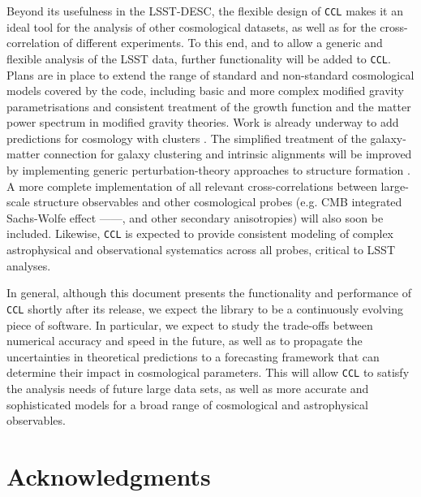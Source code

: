 \documentclass[\docopts]{\docclass}
\newcommand{\ccl}{{\tt CCL}\xspace}
\begin{document}
Beyond its usefulness in the LSST-DESC, the flexible design of \ccl makes it an ideal tool for the analysis of other cosmological datasets, as well as for the cross-correlation of different experiments. To this end, and to allow a generic and flexible analysis of the LSST data, further functionality will be added to \ccl. Plans are in place to extend the range of standard and non-standard cosmological models covered by the code, including basic and more complex modified gravity parametrisations \citep{Silvestri2013, Bellini2014} and consistent treatment of the growth function and the matter power spectrum in modified gravity theories. Work is already underway to add predictions for cosmology with clusters \citep{McClintock18}. The simplified treatment of the galaxy-matter connection for galaxy clustering and intrinsic alignments will be improved by implementing generic perturbation-theory approaches to structure formation \citep{FASTPT}. A more complete implementation of all relevant cross-correlations between large-scale structure observables and other cosmological probes (e.g. CMB integrated Sachs-Wolfe effect ---\citealt{1967ApJ...147...73S}---, and other secondary anisotropies) will also soon be included. Likewise, \ccl is expected to provide consistent modeling of complex astrophysical and observational systematics across all probes, critical to LSST analyses.

In general, although this document presents the functionality and performance of \ccl shortly after its release, we expect the library to be a continuously evolving piece of software. In particular, we expect to study the trade-offs between numerical accuracy and speed in the future, as well as to propagate the uncertainties in theoretical predictions to a forecasting framework that can determine their impact in cosmological parameters. This will allow \ccl to satisfy the analysis needs of future large data sets, as well as more accurate and sophisticated models for a broad range of cosmological and astrophysical observables.

\section*{Acknowledgments}

\vskip 5pt


\vskip 5pt



\end{document}
